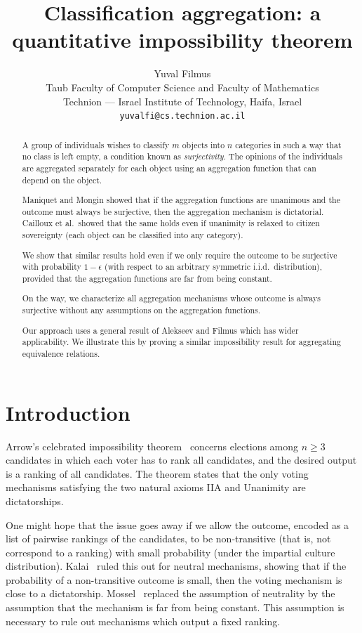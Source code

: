 \documentclass{article}
\title{Classification aggregation: a quantitative impossibility theorem}
\author{Yuval Filmus \orcidlink{0000-0002-1739-0872} \\
\small Taub Faculty of Computer Science and Faculty of Mathematics \\
\small Technion --- Israel Institute of Technology, Haifa, Israel \\
\small \texttt{yuvalfi@cs.technion.ac.il}}
\theoremstyle{definition}
\theoremstyle{remark}
\begin{document}
\maketitle
\begin{abstract}
A group of individuals wishes to classify $m$ objects into $n$ categories in such a way that no class is left empty, a condition known as \emph{surjectivity}. The opinions of the individuals are aggregated separately for each object using an aggregation function that can depend on the object.

Maniquet and Mongin showed that if the aggregation functions are unanimous and the outcome must always be surjective, then the aggregation mechanism is dictatorial. Cailloux et al.\ showed that the same holds even if unanimity is relaxed to citizen sovereignty (each object can be classified into any category).

We show that similar results hold even if we only require the outcome to be surjective with probability $1-\epsilon$ (with respect to an arbitrary symmetric i.i.d.\ distribution), provided that the aggregation functions are far from being constant.

On the way, we characterize all aggregation mechanisms whose outcome is always surjective without any assumptions on the aggregation functions.

Our approach uses a general result of Alekseev and Filmus which has wider applicability. We illustrate this by proving a similar impossibility result for aggregating equivalence relations.
\end{abstract}

\section{Introduction}
\label{sec:introduction}

Arrow's celebrated impossibility theorem~\cite{Arrow50,Arrow63} concerns elections among $n \ge 3$ candidates in which each voter has to rank all candidates, and the desired output is a ranking of all candidates. The theorem states that the only voting mechanisms satisfying the two natural axioms IIA and Unanimity are dictatorships.

One might hope that the issue goes away if we allow the outcome, encoded as a list of pairwise rankings of the candidates, to be non-transitive (that is, not correspond to a ranking) with small probability (under the impartial culture distribution). Kalai~\cite{Kalai} ruled this out for neutral mechanisms, showing that if the probability of a non-transitive outcome is small, then the voting mechanism is close to a dictatorship. Mossel~\cite{Mossel12} replaced the assumption of neutrality by the assumption that the mechanism is far from being constant. This assumption is necessary to rule out mechanisms which output a fixed ranking.
\end{document}
